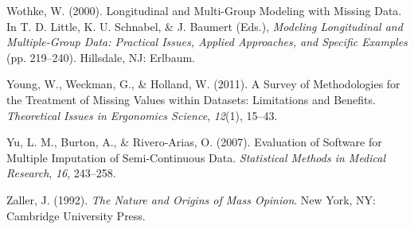 \documentclass[12pt,econ]{sources/authesis}
\begin{document}
\leavevmode\hypertarget{ref-wothke_2000_longitudinal}{}%
Wothke, W. (2000). Longitudinal and Multi-Group Modeling with Missing Data. In T. D. Little, K. U. Schnabel, \& J. Baumert (Eds.), \emph{Modeling Longitudinal and Multiple-Group Data: Practical Issues, Applied Approaches, and Specific Examples} (pp. 219--240). Hillsdale, NJ: Erlbaum.

\leavevmode\hypertarget{ref-young_2011_survey}{}%
Young, W., Weckman, G., \& Holland, W. (2011). A Survey of Methodologies for the Treatment of Missing Values within Datasets: Limitations and Benefits. \emph{Theoretical Issues in Ergonomics Science}, \emph{12}(1), 15--43.

\leavevmode\hypertarget{ref-yu_2007_evaluation}{}%
Yu, L. M., Burton, A., \& Rivero-Arias, O. (2007). Evaluation of Software for Multiple Imputation of Semi-Continuous Data. \emph{Statistical Methods in Medical Research}, \emph{16}, 243--258.

\leavevmode\hypertarget{ref-zaller_nature_1992}{}%
Zaller, J. (1992). \emph{The Nature and Origins of Mass Opinion}. New York, NY: Cambridge University Press.
\end{document}

